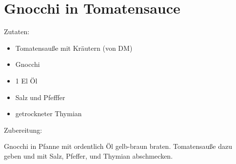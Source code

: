 \section{Gnocchi in Tomatensauce}
Zutaten:
\begin{itemize}
    \item Tomatensauße mit Kräutern (von DM)
    \item Gnocchi
    \item 1 El Öl
    \item Salz und Pfefffer
    \item getrockneter Thymian
\end{itemize}

\noindent Zubereitung:

\noindent Gnocchi in Pfanne mit ordentlich Öl gelb-braun braten. Tomatensauße dazu geben und mit Salz, Pfeffer, und Thymian abschmecken.

\newpage
\mbox{}
\vfill
\begin{center}
\end{center}
\vfill
\mbox{ }
\newpage
